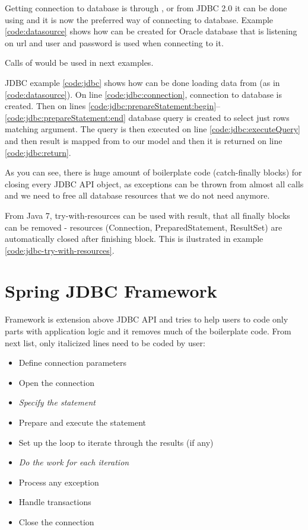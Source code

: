 Getting connection to database is through , or from JDBC 2.0
it can be done using  and it is now the preferred way of connecting to database.
Example \ref{code:datasource} shows how  can be created for Oracle database
that is listening on url 
and  user and  password is used when connecting to it.

Calls of  would be used in next examples.


JDBC example \ref{code:jdbc} shows how can be done loading data from  (as in \ref{code:datasource}).
On line \ref{code:jdbc:connection}, connection to database is created.
Then on lines \ref{code:jdbc:prepareStatement:begin}--\ref{code:jdbc:prepareStatement:end}
database query is created to select just rows matching  argument.
The query is then executed on line \ref{code:jdbc:executeQuery} and then
result is mapped from  to our  model and then it is returned on line \ref{code:jdbc:return}.

As you can see, there is huge amount of boilerplate code (catch-finally blocks) for closing every JDBC API object,
as exceptions can be thrown from almost all calls and we need to free all database resources that we do not need anymore.

From Java 7, try-with-resources can be used with result, that all finally blocks can be removed - resources
(Connection, PreparedStatement, ResultSet) are automatically closed after finishing block.
This is ilustrated in example \ref{code:jdbc-try-with-resources}.





\section{Spring JDBC Framework}
\citet{SpringJDBC} Framework is extension above JDBC API and tries to help users to code only
parts with application logic and it removes much of the boilerplate code.
From next list, only italicized lines need to be coded by user:
\begin{itemize}
  \item Define connection parameters
  \item Open the connection
  \item \textit{Specify the statement}
  \item Prepare and execute the statement
  \item Set up the loop to iterate through the results (if any)
  \item \textit{Do the work for each iteration}
  \item Process any exception
  \item Handle transactions
  \item Close the connection   
\end{itemize}


